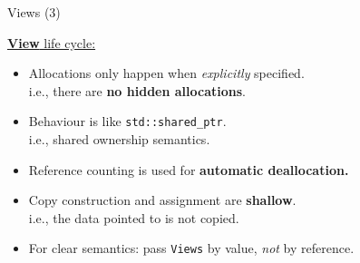 \begin{frame}[fragile]{Views (3)}

  \ul{\textbf{View} life cycle:}

  \begin{itemize}
    \item{Allocations only happen when \emph{explicitly} specified. \\
          \hspace{20pt}i.e., there are \textbf{no hidden allocations}.}
    \item{Behaviour is like \texttt{std::shared\_ptr}. \\
          \hspace{20pt}i.e., shared ownership semantics.}
    \item{Reference counting is used for \textbf{automatic deallocation.}}
    \item{Copy construction and assignment are \textbf{shallow}. \\
          \hspace{20pt}i.e., the data pointed to is not copied.}
    \item{For clear semantics: pass \texttt{Views} by value, \emph{not} by reference}.
  \end{itemize}

\end{frame}


